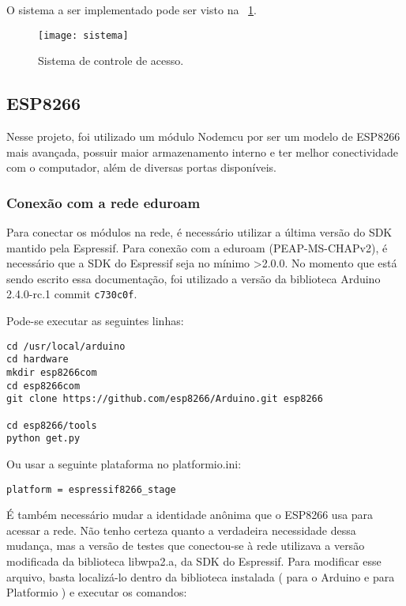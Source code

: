 \documentclass[11pt]{article}
\begin{document}
O sistema a ser implementado pode ser visto na \figurename~\ref{fig:sistema}.

\begin{figure}[!ht]
\centering
\texttt{[image: sistema]}
\caption{Sistema de controle de acesso.} \label{fig:sistema}
\end{figure}

\subsection{ESP8266}

Nesse projeto, foi utilizado um módulo Nodemcu por ser um modelo de ESP8266 mais avançada, possuir maior armazenamento interno e ter melhor conectividade com o computador, além de diversas portas disponíveis.


\subsubsection{Conexão com a rede eduroam}

Para conectar os módulos na rede, é necessário utilizar a última versão do SDK mantido pela Espressif. Para conexão com a eduroam (PEAP-MS-CHAPv2), é necessário que a SDK do Espressif seja no mínimo >2.0.0. No momento que está sendo escrito essa documentação, foi utilizado a versão da biblioteca Arduino 2.4.0-rc.1 commit \texttt{c730c0f}.

Pode-se executar as seguintes linhas:

\begin{lstlisting}
cd /usr/local/arduino
cd hardware
mkdir esp8266com
cd esp8266com
git clone https://github.com/esp8266/Arduino.git esp8266

cd esp8266/tools
python get.py
\end{lstlisting}

Ou usar a seguinte plataforma no platformio.ini:

\begin{lstlisting}
platform = espressif8266_stage
\end{lstlisting}

É também necessário mudar a identidade anônima que o ESP8266 usa para acessar a rede. Não tenho certeza quanto a verdadeira necessidade dessa mudança, mas a versão de testes que conectou-se à rede utilizava a versão modificada da biblioteca libwpa2.a, da SDK do Espressif. Para modificar esse arquivo, basta localizá-lo dentro da biblioteca instalada ( para o Arduino e  para Platformio ) e executar os comandos:
\end{document}
